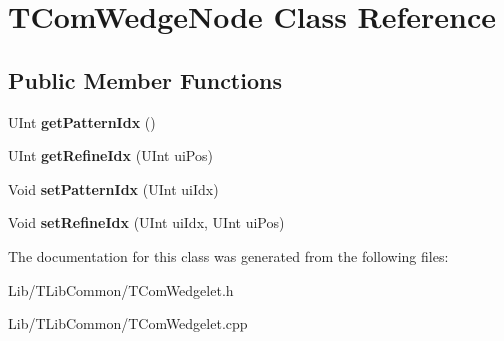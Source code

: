 \hypertarget{class_t_com_wedge_node}{}\section{T\+Com\+Wedge\+Node Class Reference}
\label{class_t_com_wedge_node}
\subsection*{Public Member Functions}
\begin{DoxyCompactItemize}
\item 
\mbox{\label{class_t_com_wedge_node_ab4c99186e836bb57de03230c5fd0dda9}} 
U\+Int {\bfseries get\+Pattern\+Idx} ()
\item 
\mbox{\label{class_t_com_wedge_node_a1e180d8566455b94a3605de5ffd157f8}} 
U\+Int {\bfseries get\+Refine\+Idx} (U\+Int ui\+Pos)
\item 
\mbox{\label{class_t_com_wedge_node_a0b4560c470f1cfd7bb0a93adef1d4095}} 
Void {\bfseries set\+Pattern\+Idx} (U\+Int ui\+Idx)
\item 
\mbox{\label{class_t_com_wedge_node_ac8b38f034de91c426fb93c12678b6d7e}} 
Void {\bfseries set\+Refine\+Idx} (U\+Int ui\+Idx, U\+Int ui\+Pos)
\end{DoxyCompactItemize}


The documentation for this class was generated from the following files\+:\begin{DoxyCompactItemize}
\item 
Lib/\+T\+Lib\+Common/T\+Com\+Wedgelet.\+h\item 
Lib/\+T\+Lib\+Common/T\+Com\+Wedgelet.\+cpp\end{DoxyCompactItemize}
